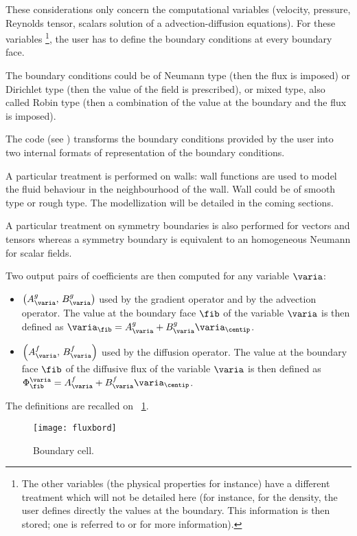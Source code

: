 These considerations only concern the computational variables  
(velocity, pressure, Reynolds tensor, 
scalars solution of a advection-diffusion equations). For these variables
\footnote{
The other variables 
(the physical properties for instance) have a different treatment which will 
not be detailed here (for instance, for the density, the user defines 
directly the values at the boundary. This information is then stored; one 
is referred to  or  for more information).
},
the user has to define the boundary conditions at every boundary face.

The boundary conditions could be of Neumann type (then the flux is imposed)
or Dirichlet type (then the value of the field is prescribed), or mixed type, also 
called Robin type (then a combination of the value at the boundary and the flux
is imposed).

The code (see ) transforms the boundary conditions provided by the user
 into two internal formats of representation of the boundary 
 conditions. 
 
 A particular treatment is performed on walls:
 wall functions are used to model the fluid behaviour in the neighbourhood of the wall.
 Wall could be of smooth type or rough type. The modellization will be detailed in the
 coming sections.
 
A particular treatment on symmetry boundaries is also performed for vectors and tensors
whereas a symmetry boundary is equivalent to an homogeneous Neumann for scalar fields.

Two output pairs of coefficients are then computed for any variable $\varia$:

\begin{itemize}
\item $\left( A^g_\varia , \, B^g_\varia\right)$ used by the gradient operator and by the advection operator. 
The value at the boundary face $\fib$ of the variable $\varia$ is 
then defined as $\varia_\fib = A^g_\varia + B^g_\varia \varia_\centip $. 
\item $\left( A^f_\varia , \, B^f_\varia\right)$ used by the diffusion operator.
The value at the boundary face $\fib$ of the diffusive flux of the variable $\varia$ 
is then defined as $\Phi^\varia_\fib = A^f_\varia + B^f_\varia \varia_\centip $.
\end{itemize}
The definitions are recalled on \figurename~\ref{Base_Condli_fig_flux_condli}.

\begin{figure}[h]
\centerline{\texttt{[image: fluxbord]}}
\caption{\label{Base_Condli_fig_flux_condli}Boundary cell.}
\end{figure}

